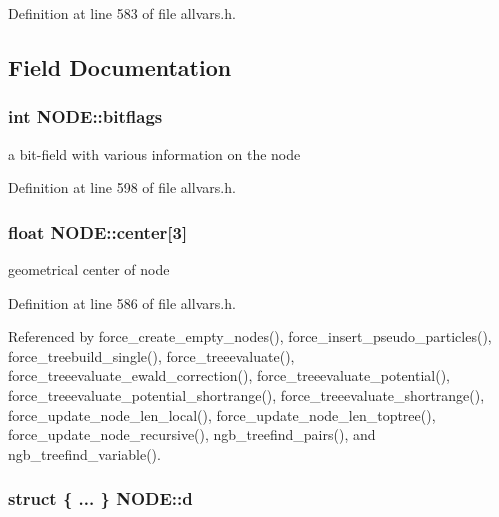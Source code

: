 Definition at line 583 of file allvars.h.



\subsection{Field Documentation}
\hypertarget{structNODE_a3678932e5e5b2947409657de4b70e8fc}{
\subsubsection[{bitflags}]{\setlength{\rightskip}{0pt plus 5cm}int {\bf NODE::bitflags}}}
\label{structNODE_a3678932e5e5b2947409657de4b70e8fc}
a bit-\/field with various information on the node 

Definition at line 598 of file allvars.h.

\hypertarget{structNODE_a27584ddd52a800cbf36c4de8e3fb4bc9}{
\subsubsection[{center}]{\setlength{\rightskip}{0pt plus 5cm}float {\bf NODE::center}\mbox{[}3\mbox{]}}}
\label{structNODE_a27584ddd52a800cbf36c4de8e3fb4bc9}
geometrical center of node 

Definition at line 586 of file allvars.h.



Referenced by force\_\-create\_\-empty\_\-nodes(), force\_\-insert\_\-pseudo\_\-particles(), force\_\-treebuild\_\-single(), force\_\-treeevaluate(), force\_\-treeevaluate\_\-ewald\_\-correction(), force\_\-treeevaluate\_\-potential(), force\_\-treeevaluate\_\-potential\_\-shortrange(), force\_\-treeevaluate\_\-shortrange(), force\_\-update\_\-node\_\-len\_\-local(), force\_\-update\_\-node\_\-len\_\-toptree(), force\_\-update\_\-node\_\-recursive(), ngb\_\-treefind\_\-pairs(), and ngb\_\-treefind\_\-variable().

\hypertarget{structNODE_a5ab829c8c9c85992ba220635f776de74}{
\subsubsection[{d}]{\setlength{\rightskip}{0pt plus 5cm}struct \{ ... \} 
     {\bf NODE::d}}}
\label{structNODE_a5ab829c8c9c85992ba220635f776de74}


